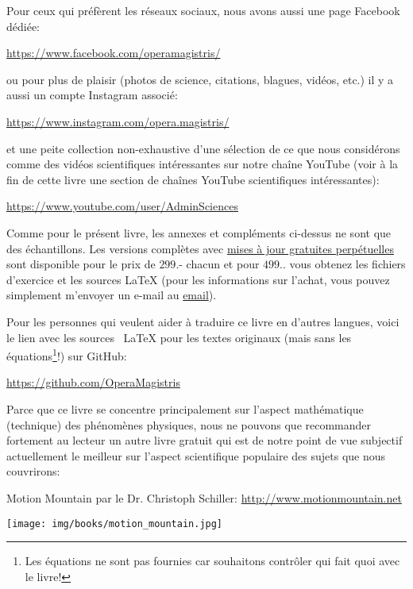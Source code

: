 	Pour ceux qui préfèrent les réseaux sociaux, nous avons aussi une page Facebook dédiée:
	\begin{center}
		\faFacebook{} \href{https://www.facebook.com/operamagistris/}{https://www.facebook.com/operamagistris/}
	\end{center}
	ou pour plus de plaisir (photos de science, citations, blagues, vidéos, etc.) il y a aussi un compte Instagram associé:
	\begin{center}
		\faInstagram{} \href{https://www.instagram.com/opera.magistris/}{https://www.instagram.com/opera.magistris/}
	\end{center}
	et une peite collection non-exhaustive d'une sélection de ce que nous considérons comme des vidéos scientifiques intéressantes sur notre chaîne YouTube (voir à la fin de cette livre une section de chaînes YouTube scientifiques intéressantes):
	\begin{center}
		\faYoutube{} \href{https://www.youtube.com/user/AdminSciences}{https://www.youtube.com/user/AdminSciences}
	\end{center}
	Comme pour le présent livre, les annexes et compléments ci-dessus ne sont que des échantillons. Les versions complètes avec \underline{mises à jour gratuites perpétuelles} sont disponible pour le prix de $299$.- chacun et pour $499$.. vous obtenez les fichiers d'exercice et les sources \LaTeX{} (pour les informations sur l'achat, vous pouvez simplement m'envoyer un e-mail au {\href{mailto:isoz@sciences.ch}{{\color{blue}email}}}).
	
	Pour les personnes qui veulent aider à traduire ce livre en d'autres langues, voici le lien avec les sources \ LaTeX {} pour les textes originaux (mais sans les équations\footnote{Les équations ne sont pas fournies car souhaitons contrôler qui fait quoi avec le livre!}!) sur GitHub:
	\begin{center}
		\faGithubSquare{} \href{https://github.com/OperaMagistris}{https://github.com/OperaMagistris}
	\end{center}
	Parce que ce livre se concentre principalement sur l'aspect mathématique (technique) des phénomènes physiques, nous ne pouvons que recommander fortement au lecteur un autre livre gratuit qui est de notre point de vue subjectif actuellement le meilleur sur l'aspect scientifique populaire des sujets que nous couvrirons:
	\begin{center}
	Motion Mountain par le Dr. Christoph Schiller: \url{http://www.motionmountain.net}
	\end{center}
	\begin{center}
		\texttt{[image: img/books/motion\_mountain.jpg]}
	\end{center}

